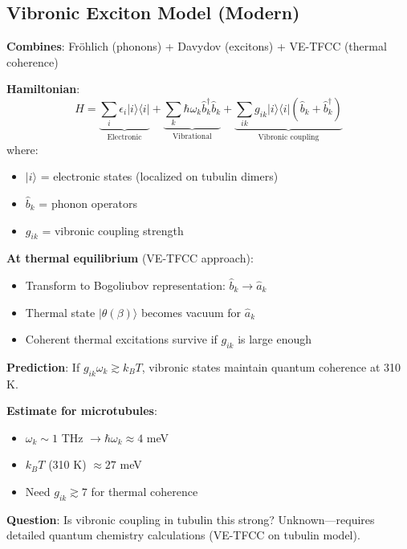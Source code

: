 \subsection{Vibronic Exciton Model (Modern)}\label{vibronic-exciton-model-modern}

\textbf{Combines}: Fröhlich (phonons) + Davydov (excitons) + VE-TFCC (thermal coherence)

\textbf{Hamiltonian}:
\begin{equation}
\label{eq:vibronic-hamiltonian}
\hat{H} = \underbrace{\sum_i \epsilon_i | i \rangle \langle i |}_{\text{Electronic}} + \underbrace{\sum_k \hbar \omega_k \hat{b}_k^\dagger \hat{b}_k}_{\text{Vibrational}} + \underbrace{\sum_{ik} g_{ik} | i \rangle \langle i | (\hat{b}_k + \hat{b}_k^\dagger)}_{\text{Vibronic coupling}}
\end{equation}
where:
\begin{itemize}
\item $| i \rangle$ = electronic states (localized on tubulin dimers)
\item $\hat{b}_k$ = phonon operators
\item $g_{ik}$ = vibronic coupling strength
\end{itemize}

\textbf{At thermal equilibrium} (VE-TFCC approach):
\begin{itemize}
\item Transform to Bogoliubov representation: $\hat{b}_k \rightarrow \hat{a}_k$
\item Thermal state $|\theta(\beta)\rangle$ becomes vacuum for $\hat{a}_k$
\item Coherent thermal excitations survive if $g_{ik}$ is large enough
\end{itemize}

\textbf{Prediction}: If $g_{ik} \omega_k \gtrsim k_B T$, vibronic states maintain quantum coherence at 310 K.

\textbf{Estimate for microtubules}:
\begin{itemize}
\item $\omega_k \sim 1$ THz $\rightarrow \hbar \omega_k \approx 4$ meV
\item $k_B T$ (310 K) $\approx 27$ meV
\item Need $g_{ik} \gtrsim 7$ for thermal coherence
\end{itemize}

\textbf{Question}: Is vibronic coupling in tubulin this strong? Unknown---requires detailed quantum chemistry calculations (VE-TFCC on tubulin model).


